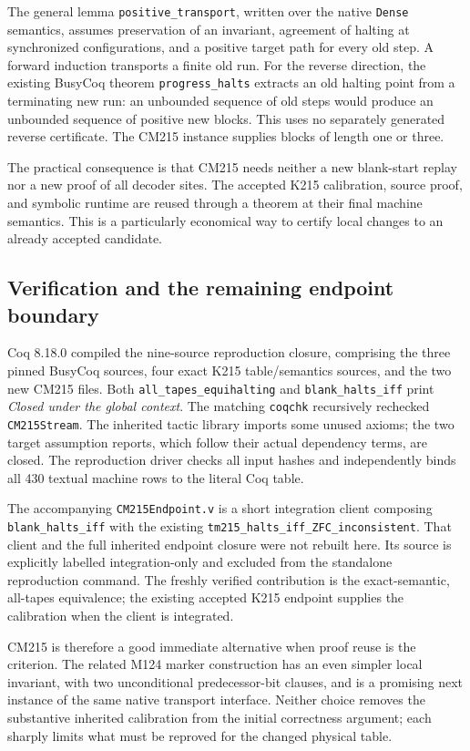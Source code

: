 The general lemma \texttt{positive\_transport}, written over the native
\texttt{Dense} semantics, assumes preservation of an invariant, agreement
of halting at synchronized configurations, and a positive target path for
every old step. A forward induction transports a finite old run. For the
reverse direction, the existing BusyCoq theorem
\texttt{progress\_halts} extracts an old halting point from a terminating
new run: an unbounded sequence of old steps would produce an unbounded
sequence of positive new blocks. This uses no separately generated reverse
certificate. The CM215 instance supplies blocks of length one or three.

The practical consequence is that CM215 needs neither a new blank-start
replay nor a new proof of all decoder sites. The accepted K215 calibration,
source proof, and symbolic runtime are reused through a theorem at their
final machine semantics. This is a particularly economical way to certify
local changes to an already accepted candidate.

\subsection{Verification and the remaining endpoint boundary}

Coq 8.18.0 compiled the nine-source reproduction closure, comprising the
three pinned BusyCoq sources, four exact K215 table/semantics sources, and
the two new CM215 files. Both \texttt{all\_tapes\_equihalting} and
\texttt{blank\_halts\_iff} print \emph{Closed under the global context}.
The matching \texttt{coqchk} recursively rechecked \texttt{CM215Stream}.
The inherited tactic library imports some unused axioms; the two target
assumption reports, which follow their actual dependency terms, are closed.
The reproduction driver checks all input hashes and independently binds
all 430 textual machine rows to the literal Coq table.

The accompanying \texttt{CM215Endpoint.v} is a short integration client
composing \texttt{blank\_halts\_iff} with the existing
\texttt{tm215\_halts\_iff\_ZFC\_inconsistent}. That client and the full
inherited endpoint closure were not rebuilt here. Its source is explicitly
labelled integration-only and excluded from the standalone reproduction
command. The freshly verified contribution is the exact-semantic,
all-tapes equivalence; the existing accepted K215 endpoint supplies the
calibration when the client is integrated.

CM215 is therefore a good immediate alternative when proof reuse is the
criterion. The related M124 marker construction has an even simpler local
invariant, with two unconditional predecessor-bit clauses, and is a
promising next instance of the same native transport interface. Neither
choice removes the substantive inherited calibration from the initial
correctness argument; each sharply limits what must be reproved for the
changed physical table.
